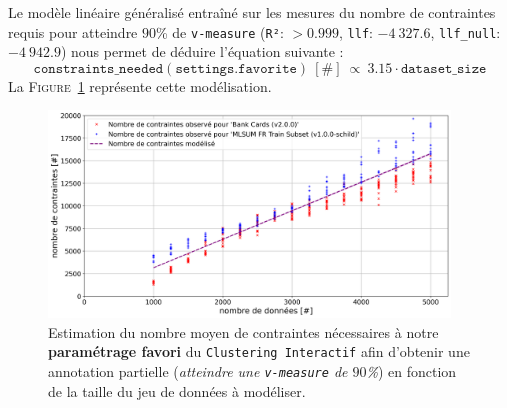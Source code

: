 			Le modèle linéaire généralisé entraîné sur les mesures du nombre de contraintes requis pour atteindre $90$\% de \texttt{v-measure} (\texttt{R²}: $> 0.999$, \texttt{llf}: $-4~327.6$, \texttt{llf\_null}: $-4~942.9$) nous permet de déduire l'équation suivante :
			\begin{equation}
				\label{equation:4.3.3-ETUDE-COUT-NOMBRE-CONTRAINTES}
				\texttt{constraints\_needed}(\texttt{settings.favorite})~[\#]~
				\propto~3.15 \cdot \texttt{dataset\_size}
			\end{equation}
			La \textsc{Figure~\ref{figure:4.3.3-ETUDE-COUT-NOMBRE-CONTRAINTES}} représente cette modélisation.
			\newline
			\begin{figure}[!htb]
				\centering
				\includegraphics[width=0.95\textwidth]{figures/etude-nombre-contraintes-1-modelisation-nombre}
				\caption{
					Estimation du nombre moyen de contraintes nécessaires à notre \textbf{paramétrage favori} du \texttt{Clustering Interactif} afin d'obtenir une annotation partielle (\textit{atteindre une \texttt{v-measure} de $90$\%}) en fonction de la taille du jeu de données à modéliser.
				}
				\label{figure:4.3.3-ETUDE-COUT-NOMBRE-CONTRAINTES}
			\end{figure}
		
